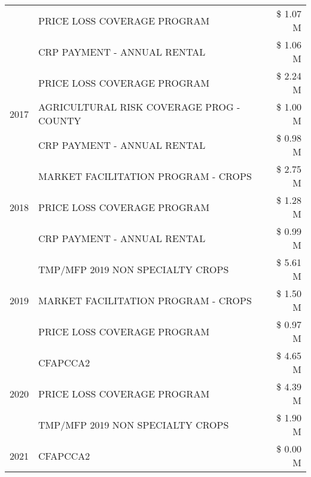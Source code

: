 \begin{tabular}{llr}
 & PRICE LOSS COVERAGE PROGRAM & \$ 1.07 M \\
 & CRP PAYMENT - ANNUAL RENTAL & \$ 1.06 M \\
\cline{1-3}
\multirow[t]{3}{*}{2017} & PRICE LOSS COVERAGE PROGRAM & \$ 2.24 M \\
 & AGRICULTURAL RISK COVERAGE PROG - COUNTY & \$ 1.00 M \\
 & CRP PAYMENT - ANNUAL RENTAL & \$ 0.98 M \\
\cline{1-3}
\multirow[t]{3}{*}{2018} & MARKET FACILITATION PROGRAM - CROPS & \$ 2.75 M \\
 & PRICE LOSS COVERAGE PROGRAM & \$ 1.28 M \\
 & CRP PAYMENT - ANNUAL RENTAL & \$ 0.99 M \\
\cline{1-3}
\multirow[t]{3}{*}{2019} & TMP/MFP 2019 NON SPECIALTY CROPS & \$ 5.61 M \\
 & MARKET FACILITATION PROGRAM - CROPS & \$ 1.50 M \\
 & PRICE LOSS COVERAGE PROGRAM & \$ 0.97 M \\
\cline{1-3}
\multirow[t]{3}{*}{2020} & CFAPCCA2 & \$ 4.65 M \\
 & PRICE LOSS COVERAGE PROGRAM & \$ 4.39 M \\
 & TMP/MFP 2019 NON SPECIALTY CROPS & \$ 1.90 M \\
\cline{1-3}
2021 & CFAPCCA2 & \$ 0.00 M \\
\cline{1-3}
\bottomrule
\end{tabular}
